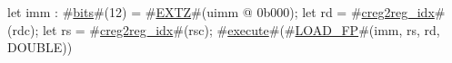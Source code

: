 let imm : #\hyperref[sailRISCVzbits]{bits}#(12) = #\hyperref[sailRISCVzEXTZ]{EXTZ}#(uimm @ 0b000);
let rd = #\hyperref[sailRISCVzcreg2regzyidx]{creg2reg\_idx}#(rdc);
let rs = #\hyperref[sailRISCVzcreg2regzyidx]{creg2reg\_idx}#(rsc);
#\hyperref[sailRISCVzexecute]{execute}#(#\hyperref[sailRISCVzLOADzyFP]{LOAD\_FP}#(imm, rs, rd, DOUBLE))
